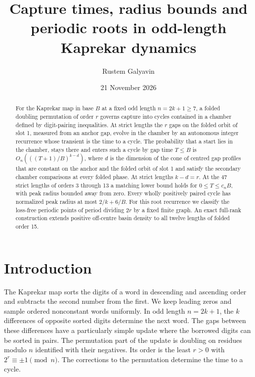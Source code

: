 \documentclass[11pt]{amsart}
\title[Capture times and periodic roots]{Capture times, radius bounds and periodic roots in odd-length Kaprekar dynamics}
\author{Rustem Galyavin}
\date{21 November 2026}
\theoremstyle{definition}
\begin{document}
\begin{abstract}
For the Kaprekar map in base \(B\) at a fixed odd length
\(n=2k+1\ge7\), a folded doubling permutation of order \(r\) governs
capture into cycles contained in a chamber defined by digit-pairing
inequalities. At strict lengths the \(r\) gaps on the folded orbit of
slot 1, measured from an anchor gap, evolve in the chamber by an
autonomous integer recurrence whose transient is the time to a cycle.
The probability that a start lies in the chamber, stays there and enters
such a cycle by gap time \(T\le B\) is \(O_n(((T+1)/B)^{k-d})\), where
\(d\) is the dimension of the cone of centred gap profiles that are
constant on the anchor and the folded orbit of slot 1 and satisfy the
secondary chamber comparisons at every folded phase. At strict lengths
\(k-d=r\). At the 47 strict lengths of orders 3 through 13 a matching
lower bound holds for \(0\le T\le c_nB\), with peak radius bounded away
from zero. Every wholly positively paired cycle has normalized peak
radius at most \(2/k+6/B\). For this root recurrence we classify the
loss-free periodic points of period dividing \(2r\) by a fixed finite
graph. An exact full-rank construction extends positive off-centre basin
density to all twelve lengths of folded order 15.
\end{abstract}
\maketitle

\section{Introduction}

The Kaprekar map sorts the digits of a word in descending and ascending
order and subtracts the second number from the first. We keep leading
zeros and sample ordered nonconstant words uniformly. In odd length
\(n=2k+1\), the \(k\) differences of opposite sorted digits determine
the next word. The gaps between these differences have a particularly
simple update where the borrowed digits can be sorted in pairs. The
permutation part of the update is doubling on residues modulo \(n\)
identified with their negatives. Its order is the least \(r>0\) with
\(2^r\equiv\pm1\pmod n\). The corrections to the permutation determine
the time to a cycle.
\end{document}

